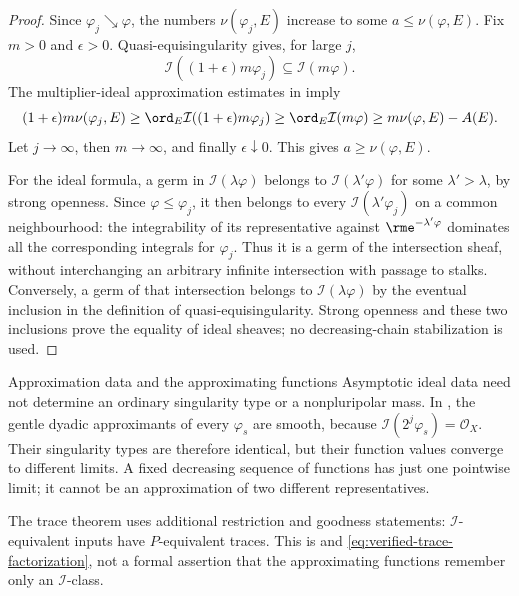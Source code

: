 \begin{proof}
Since $\varphi_j\searrow\varphi$, the numbers
$\nu(\varphi_j,E)$ increase to some $a\le\nu(\varphi,E)$.
Fix $m>0$ and $\epsilon>0$.  Quasi-equisingularity gives, for large $j$,
\[
 \mathcal I((1+\epsilon)m\varphi_j)
                  \subseteq\mathcal I(m\varphi).
\]
The multiplier-ideal approximation estimates in
 imply
\[
 (1+\epsilon)m\nu(\varphi_j,E)
 \ge \ord_E\mathcal I((1+\epsilon)m\varphi_j)
 \ge \ord_E\mathcal I(m\varphi)
 \ge m\nu(\varphi,E)-A(E).
\]
Let $j\to\infty$, then $m\to\infty$, and finally
$\epsilon\downarrow0$.  This gives $a\ge\nu(\varphi,E)$.

For the ideal formula, a germ in $\mathcal I(\lambda\varphi)$ belongs
to $\mathcal I(\lambda'\varphi)$ for some $\lambda'>\lambda$, by
strong openness.  Since $\varphi\le\varphi_j$, it then belongs to
every $\mathcal I(\lambda'\varphi_j)$ on a common neighbourhood:
the integrability of its representative against
$\rme^{-\lambda'\varphi}$ dominates all the corresponding integrals
for $\varphi_j$.  Thus it is a germ of the intersection sheaf, without
interchanging an arbitrary infinite intersection with passage to stalks.
Conversely, a germ of that intersection belongs to
$\mathcal I(\lambda\varphi)$ by the eventual inclusion in the definition
of quasi-equisingularity.  Strong openness and these two inclusions prove
the equality of ideal sheaves; no decreasing-chain stabilization is used.
\end{proof}

\begin{warning}{Approximation data and the approximating functions}
\label{warn:ch51-qes}
Asymptotic ideal data need not determine an ordinary singularity type or
a nonpluripolar mass.  In , the gentle dyadic
approximants of every $\varphi_s$ are smooth, because
$\mathcal I(2^j\varphi_s)=\mathcal O_X$.  Their singularity types are
therefore identical, but their function values converge to different
limits.  A fixed decreasing sequence of functions has just one pointwise
limit; it cannot be an approximation of two different representatives.

The trace theorem uses additional restriction and goodness statements:
$\mathcal I$-equivalent inputs have $P$-equivalent traces.  This is
and \eqref{eq:verified-trace-factorization}, not a formal assertion that
the approximating functions remember only an $\mathcal I$-class.
\end{warning}

